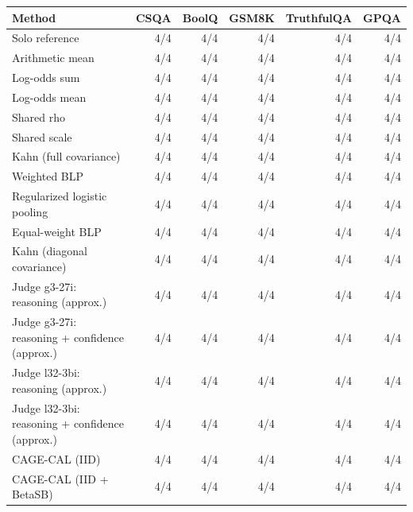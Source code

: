 \begin{tabular}{lrrrrr}
\toprule
Method & CSQA & BoolQ & GSM8K & TruthfulQA & GPQA \\
\midrule
Solo reference & 4/4 & 4/4 & 4/4 & 4/4 & 4/4 \\
Arithmetic mean & 4/4 & 4/4 & 4/4 & 4/4 & 4/4 \\
Log-odds sum & 4/4 & 4/4 & 4/4 & 4/4 & 4/4 \\
Log-odds mean & 4/4 & 4/4 & 4/4 & 4/4 & 4/4 \\
Shared rho & 4/4 & 4/4 & 4/4 & 4/4 & 4/4 \\
Shared scale & 4/4 & 4/4 & 4/4 & 4/4 & 4/4 \\
Kahn (full covariance) & 4/4 & 4/4 & 4/4 & 4/4 & 4/4 \\
Weighted BLP & 4/4 & 4/4 & 4/4 & 4/4 & 4/4 \\
Regularized logistic pooling & 4/4 & 4/4 & 4/4 & 4/4 & 4/4 \\
Equal-weight BLP & 4/4 & 4/4 & 4/4 & 4/4 & 4/4 \\
Kahn (diagonal covariance) & 4/4 & 4/4 & 4/4 & 4/4 & 4/4 \\
Judge g3-27i: reasoning (approx.) & 4/4 & 4/4 & 4/4 & 4/4 & 4/4 \\
Judge g3-27i: reasoning + confidence (approx.) & 4/4 & 4/4 & 4/4 & 4/4 & 4/4 \\
Judge l32-3bi: reasoning (approx.) & 4/4 & 4/4 & 4/4 & 4/4 & 4/4 \\
Judge l32-3bi: reasoning + confidence (approx.) & 4/4 & 4/4 & 4/4 & 4/4 & 4/4 \\
CAGE-CAL (IID) & 4/4 & 4/4 & 4/4 & 4/4 & 4/4 \\
CAGE-CAL (IID + BetaSB) & 4/4 & 4/4 & 4/4 & 4/4 & 4/4 \\
\bottomrule
\end{tabular}
